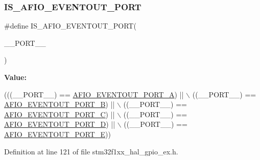 \mbox{\label{group___g_p_i_o_ex___e_v_e_n_t_o_u_t___p_o_r_t_ga9e6c9f1f73af1b6f579f050bd00cc43b}} 
\subsubsection{\texorpdfstring{I\+S\+\_\+\+A\+F\+I\+O\+\_\+\+E\+V\+E\+N\+T\+O\+U\+T\+\_\+\+P\+O\+RT}{IS\_AFIO\_EVENTOUT\_PORT}}
{\footnotesize\ttfamily \#define I\+S\+\_\+\+A\+F\+I\+O\+\_\+\+E\+V\+E\+N\+T\+O\+U\+T\+\_\+\+P\+O\+RT(\begin{DoxyParamCaption}\item[{}]{\+\_\+\+\_\+\+P\+O\+R\+T\+\_\+\+\_\+ }\end{DoxyParamCaption})}

{\bfseries Value\+:}
\begin{DoxyCode}
(((\_\_PORT\_\_) == \hyperlink{group___g_p_i_o_ex___e_v_e_n_t_o_u_t___p_o_r_t_ga923160935b624e039735fb52e0e3f848}{AFIO\_EVENTOUT\_PORT\_A}) || \(\backslash\)
                                         ((\_\_PORT\_\_) == \hyperlink{group___g_p_i_o_ex___e_v_e_n_t_o_u_t___p_o_r_t_ga6fcb0bbd79fa6194d268c8eda55637b8}{AFIO\_EVENTOUT\_PORT\_B}) || \(\backslash\)
                                         ((\_\_PORT\_\_) == \hyperlink{group___g_p_i_o_ex___e_v_e_n_t_o_u_t___p_o_r_t_gafed308a7c2b954b28e89b11e4087a6ea}{AFIO\_EVENTOUT\_PORT\_C}) || \(\backslash\)
                                         ((\_\_PORT\_\_) == \hyperlink{group___g_p_i_o_ex___e_v_e_n_t_o_u_t___p_o_r_t_gac7639a5273dd5f7be582b41b5d5e71b6}{AFIO\_EVENTOUT\_PORT\_D}) || \(\backslash\)
                                         ((\_\_PORT\_\_) == \hyperlink{group___g_p_i_o_ex___e_v_e_n_t_o_u_t___p_o_r_t_ga0aeff714f7ceb462a26915788adddefb}{AFIO\_EVENTOUT\_PORT\_E}))
\end{DoxyCode}


Definition at line 121 of file stm32f1xx\+\_\+hal\+\_\+gpio\+\_\+ex.\+h.

